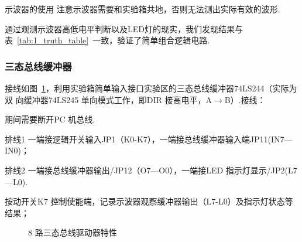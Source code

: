 \documentclass[11pt]{SEU-Digital-Report}
\begin{document}
                \begin{note}{示波器的使用}{}
                    注意示波器需要和实验箱共地，否则无法测出实际有效的波形.
                \end{note}

                \begin{analyze}{}{}
                    通过观测示波器高低电平判断以及LED灯的现实，我们发现结果与表~\ref{tab:1_truth_table}~一致，验证了简单组合逻辑电路.
                \end{analyze}

            \subsubsection{三态总线缓冲器}

            接线如图~\ref{fig:exp_3logic}，利用实验箱简单输入接口实验区的三态总线缓冲器74LS244（实际为双
            向缓冲器74LS245 单向模式工作，即DIR 接高电平，A$\rightarrow$B）.接线：
            \begin{note}{}{}
                期间需要断开PC 机总线.
            \end{note}
            排线1 一端接逻辑开关输入JP1（K0-K7），一端接总线缓冲器输入端JP11(IN7---IN0)；

            排线2 一端接总线缓冲器输出/JP12（O7---O0），一端接LED 指示灯显示/JP2(L7---L0).

            按动开关K7 控制使能端，记录示波器观察缓冲器输出（L7-L0）及指示灯状态等结果；

            \begin{figure}[htbp]
                \centering
                \qquad
                \caption{8 路三态总线驱动器特性\cite{guide}}
                \label{fig:exp_3logic}
            \end{figure}
\end{document}
